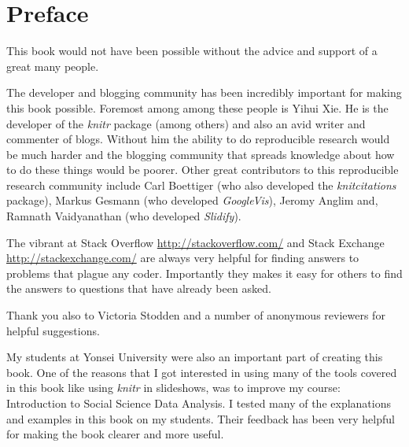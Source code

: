 


\chapter*{Preface}


\noindent This book would not have been possible without the advice and support of a great many people.

The developer and blogging community has been incredibly important for making this book possible. Foremost among among these people is Yihui Xie. He is the developer of the {\emph{knitr}} package (among others) and also an avid writer and commenter of blogs. Without him the ability to do reproducible research would be much harder and the blogging community that spreads knowledge about how to do these things would be poorer. Other great contributors to this reproducible research community include Carl Boettiger (who also developed the {\emph{knitcitations}} package), Markus Gesmann (who developed {\emph{GoogleVis}}), Jeromy Anglim and, Ramnath Vaidyanathan (who developed {\emph{Slidify}}).

The vibrant at Stack Overflow \url{http://stackoverflow.com/} and Stack Exchange \url{http://stackexchange.com/} are always very helpful for finding answers to problems that plague any coder. Importantly they makes it easy for others to find the answers to questions that have already been asked.

Thank you also to Victoria Stodden and a number of anonymous reviewers for helpful suggestions.

My students at Yonsei University were also an important part of creating this book. One of the reasons that I got interested in using many of the tools covered in this book like using {\emph{knitr}} in slideshows, was to improve my course: Introduction to Social Science Data Analysis. I tested many of the explanations and examples in this book on my students. Their feedback has been very helpful for making the book clearer and more useful.
